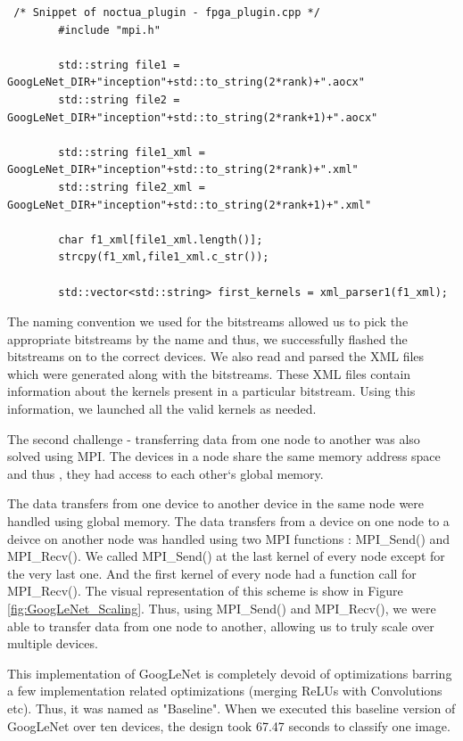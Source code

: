 \begin{code}[!htb]
 \begin{verbatim}
 /* Snippet of noctua_plugin - fpga_plugin.cpp */
        #include "mpi.h"  
        
        std::string file1 = GoogLeNet_DIR+"inception"+std::to_string(2*rank)+".aocx" 
        std::string file2 = GoogLeNet_DIR+"inception"+std::to_string(2*rank+1)+".aocx"  
        
        std::string file1_xml = GoogLeNet_DIR+"inception"+std::to_string(2*rank)+".xml"
        std::string file2_xml = GoogLeNet_DIR+"inception"+std::to_string(2*rank+1)+".xml"   
        
        char f1_xml[file1_xml.length()];
        strcpy(f1_xml,file1_xml.c_str());  
        
        std::vector<std::string> first_kernels = xml_parser1(f1_xml);

\end{verbatim}
\label{code:MPICode_fpga_plugin}
\end{code}

The naming convention we used for the bitstreams allowed us to pick the appropriate bitstreams by the name and thus, we successfully flashed the bitstreams on to the correct devices. We also read and parsed the XML files which were generated along with the bitstreams. These XML files contain information about the kernels present in a particular bitstream. Using this information, we launched all the valid kernels as needed. 

The second challenge - transferring data from one node to another was also solved using MPI. The devices in a node share the same memory address space and thus , they had access to each other`s global memory.   

The data transfers from one device to another device in the same node were handled using global memory. The data transfers from a device on one node to a deivce on another node was handled using two MPI functions : MPI\_Send() and MPI\_Recv(). We called MPI\_Send() at the last kernel of every node except for the very last one. And the first kernel of every node had a function call for MPI\_Recv(). The visual representation of this scheme is show in Figure \ref{fig:GoogLeNet_Scaling}. Thus, using  MPI\_Send() and MPI\_Recv(), we were able to transfer data from one node to another, allowing us to truly scale over multiple devices.

This implementation of GoogLeNet is completely devoid of optimizations barring a few implementation related optimizations (merging ReLUs with Convolutions etc). Thus, it was named as "Baseline". When we executed this baseline version of GoogLeNet over ten devices, the design took 67.47 seconds to classify one image.  

